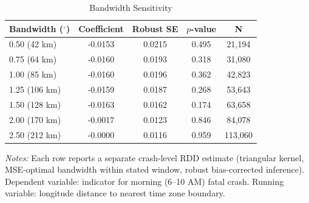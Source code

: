\begin{table}[htbp]
\centering
\caption{Bandwidth Sensitivity}
\label{tab:bandwidth}
\begin{threeparttable}
\begin{tabular}{lcccc}
\toprule
Bandwidth ($^\circ$) & Coefficient & Robust SE & $p$-value & N \\
\midrule
0.50 (42 km) & -0.0153 & 0.0215 & 0.495 & 21,194 \\
0.75 (64 km) & -0.0160 & 0.0193 & 0.318 & 31,080 \\
1.00 (85 km) & -0.0160 & 0.0196 & 0.362 & 42,823 \\
1.25 (106 km) & -0.0159 & 0.0187 & 0.268 & 53,643 \\
1.50 (128 km) & -0.0163 & 0.0162 & 0.174 & 63,658 \\
2.00 (170 km) & -0.0017 & 0.0123 & 0.846 & 84,078 \\
2.50 (212 km) & -0.0000 & 0.0116 & 0.959 & 113,060 \\
\bottomrule
\end{tabular}
\begin{tablenotes}[flushleft]\small
\item \textit{Notes:} Each row reports a separate crash-level RDD estimate (triangular kernel, MSE-optimal bandwidth within stated window, robust bias-corrected inference). Dependent variable: indicator for morning (6--10 AM) fatal crash. Running variable: longitude distance to nearest time zone boundary.
\end{tablenotes}
\end{threeparttable}
\end{table}

